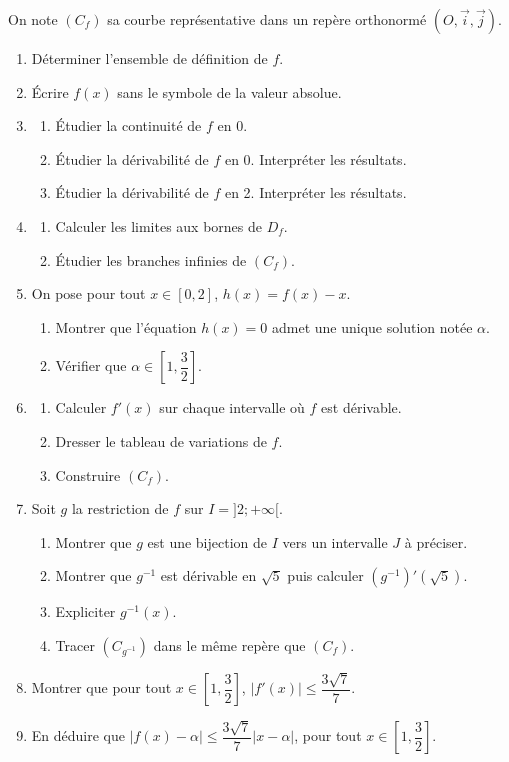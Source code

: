 \documentclass[12pt,a4paper]{article}
\begin{document}
On note $(C_f)$ sa courbe représentative dans un repère orthonormé $(O, \vec{i}, \vec{j})$.

\begin{enumerate}
    \item Déterminer l’ensemble de définition de $f$.
    \item Écrire $f(x)$ sans le symbole de la valeur absolue.
    \item
    \begin{enumerate}
        \item Étudier la continuité de $f$ en 0.
        \item Étudier la dérivabilité de $f$ en 0. Interpréter les résultats.
        \item Étudier la dérivabilité de $f$ en 2. Interpréter les résultats.
    \end{enumerate}
    \item
    \begin{enumerate}
        \item Calculer les limites aux bornes de $D_f$.
        \item Étudier les branches infinies de $(C_f)$.
    \end{enumerate}
    \item On pose pour tout $x \in [0, 2]$, $h(x) = f(x) - x$.
    \begin{enumerate}
        \item Montrer que l’équation $h(x) = 0$ admet une unique solution notée $\alpha$.
        \item Vérifier que $\alpha \in \left[1, \dfrac{3}{2}\right]$.
    \end{enumerate}
    \item
    \begin{enumerate}
        \item Calculer $f'(x)$ sur chaque intervalle où $f$ est dérivable.
        \item Dresser le tableau de variations de $f$.
        \item[(c)] Construire $(C_f)$.
    \end{enumerate}
    \item[7.] Soit $g$ la restriction de $f$ sur $I = ]2; +\infty[$.
    \begin{enumerate}
        \item Montrer que $g$ est une bijection de $I$ vers un intervalle $J$ à préciser.
        \item Montrer que $g^{-1}$ est dérivable en $\sqrt{5}$ puis calculer $(g^{-1})'(\sqrt{5})$.
        \item Expliciter $g^{-1}(x)$.
        \item Tracer $(C_{g^{-1}})$ dans le même repère que $(C_f)$.
    \end{enumerate}
    \item[8.] Montrer que pour tout $x \in \left[ 1, \dfrac{3}{2} \right]$, $|f'(x)| \leq \dfrac{3\sqrt{7}}{7}$.
    \item[9.] En déduire que $|f(x) - \alpha| \leq \dfrac{3\sqrt{7}}{7} |x - \alpha|$, pour tout $x \in \left[ 1, \dfrac{3}{2} \right]$.
\end{enumerate}
\end{document}
